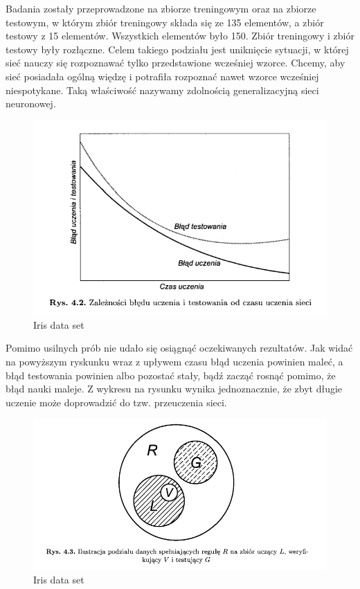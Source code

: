 \documentclass{classrep}
\begin{document}
\clearpage

Badania zostały przeprowadzone na zbiorze treningowym oraz na zbiorze testowym, w którym zbiór treningowy składa się ze 135 elementów, a zbiór testowy z 15 elementów. Wszystkich elementów było 150. Zbiór treningowy i zbiór testowy były rozłączne. Celem takiego podziału jest uniknięcie sytuacji, w której sieć nauczy się rozpoznawać tylko przedstawione wcześniej wzorce. Chcemy, aby sieć posiadała ogólną więdzę i potrafiła rozpoznać nawet wzorce wcześniej niespotykane. Taką właściwość nazywamy zdolnością generalizacyjną sieci neuronowej.

\begin{figure}[ht]
\centering
			\includegraphics[scale=0.65]{pictures/Iris11.png}
	\caption{Iris data set}
	\label{fig:Iris data set}
\end{figure}

Pomimo usilnych prób nie udało się osiągnąć oczekiwanych rezultatów. Jak widać na powyższym ryskunku wraz z upływem czasu błąd uczenia powinien maleć, a błąd testowania powinien albo pozostać stały, bądź zacząć rosnąć pomimo, że błąd nauki maleje. Z wykresu na rysunku wynika jednoznacznie, że zbyt długie uczenie może doprowadzić do tzw. przeuczenia sieci.

\begin{figure}[ht]
\centering
			\includegraphics[scale=0.65]{pictures/Iris10.png}
	\caption{Iris data set}
	\label{fig:Iris data set}
\end{figure}
\end{document}
